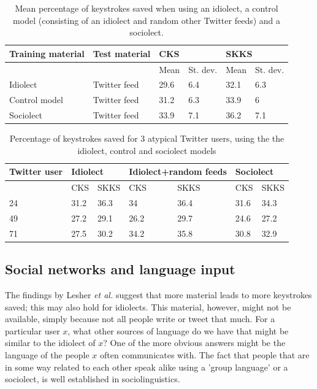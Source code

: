 \documentclass[12pt]{article}
\begin{document}
{\begin{table}[htb] 
\centering
\begin{tabular}{ll|llll} 
Training material&Test material&\multicolumn{2}{l}{CKS}&\multicolumn{2}{l}{SKKS}\\
\hline
&&Mean&St. dev.&Mean&St. dev.\\
Idiolect&Twitter feed&29.6&6.4&32.1&6.3\\
Control model&Twitter feed&31.2&6.3&33.9&6\\
Sociolect&Twitter feed&33.9&7.1&36.2&7.1\\
\end{tabular} 
\caption{Mean percentage of keystrokes saved when using an idiolect, a control model (consisting of an idiolect and random other Twitter feeds) and a sociolect.} \label{socio_results}
\end{table}

\begin{table}[htb] 
\centering
\begin{tabular}{l|llllll} 
Twitter user&\multicolumn{2}{l}{Idiolect}&\multicolumn{2}{l}{Idiolect+random feeds}&\multicolumn{2}{l}{Sociolect}\\
\hline
&CKS&SKKS&CKS&SKKS&CKS&SKKS\\
24&31.2&36.3&34&36.4&31.6&34.3\\
49&27.2&29.1&26.2&29.7&24.6&27.2\\
71&27.5&30.2&34.2&35.8&30.8&32.9\\
\end{tabular} 
\caption{Percentage of keystrokes saved for 3 atypical Twitter users, using the the idiolect, control and sociolect models}
\label{deviations}
\end{table}

\subsection{Social networks and language input} \label{input_networks}

The findings by Lesher {\em et al.} \citeyear{Lesher+99} suggest that more material leads to more keystrokes saved; this may also hold for idiolects. This material, however, might not be available, simply because not all people write or tweet that much. For a particular user $x$, what other sources of language do we have that might be similar to the idiolect of $x$? One of the more obvious answers might be the language of the people $x$ often communicates with. The fact that people that are in some way related to each other speak alike using a 'group language' or a sociolect, is well established in sociolinguistics.

}
\end{document}
